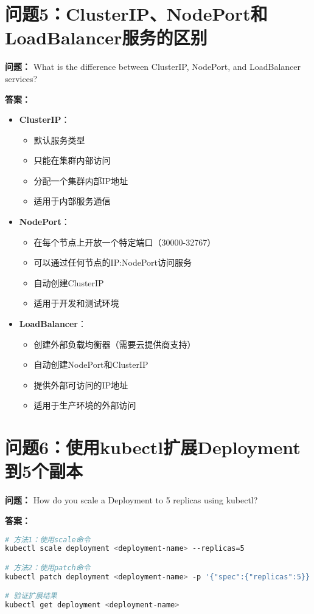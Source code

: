 \documentclass[12pt,a4paper]{article}
\begin{document}
\section{问题5：ClusterIP、NodePort和LoadBalancer服务的区别}

\textbf{问题：} What is the difference between ClusterIP, NodePort, and LoadBalancer services?

\textbf{答案：}

\begin{itemize}
    \item \textbf{ClusterIP}：
    \begin{itemize}
        \item 默认服务类型
        \item 只能在集群内部访问
        \item 分配一个集群内部IP地址
        \item 适用于内部服务通信
    \end{itemize}
    
    \item \textbf{NodePort}：
    \begin{itemize}
        \item 在每个节点上开放一个特定端口（30000-32767）
        \item 可以通过任何节点的IP:NodePort访问服务
        \item 自动创建ClusterIP
        \item 适用于开发和测试环境
    \end{itemize}
    
    \item \textbf{LoadBalancer}：
    \begin{itemize}
        \item 创建外部负载均衡器（需要云提供商支持）
        \item 自动创建NodePort和ClusterIP
        \item 提供外部可访问的IP地址
        \item 适用于生产环境的外部访问
    \end{itemize}
\end{itemize}

\section{问题6：使用kubectl扩展Deployment到5个副本}

\textbf{问题：} How do you scale a Deployment to 5 replicas using kubectl?

\textbf{答案：}
\begin{lstlisting}[language=bash]
# 方法1：使用scale命令
kubectl scale deployment <deployment-name> --replicas=5

# 方法2：使用patch命令
kubectl patch deployment <deployment-name> -p '{"spec":{"replicas":5}}'

# 验证扩展结果
kubectl get deployment <deployment-name>
\end{lstlisting}
\end{document}
